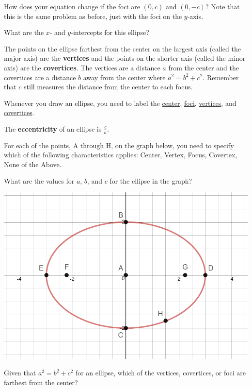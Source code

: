 \begin{annotation}
\end{annotation}

\bq \be
\item How does your equation change if the foci are $(0,c)$ and $(0,-c)$? Note that this is the same problem as before, just with the foci on the $y$-axis.
\item What are the $x$- and $y$-intercepts for this ellipse?
\ee \eq

\begin{info}
The points on the ellipse farthest from the center on the largest axis (called the major axis) are the \textbf{vertices} and the points on the shorter axis (called the minor axis) are the \textbf{covertices}. The vertices are a distance $a$ from the center and the covertices are a distance $b$ away from the center where $a^2=b^2+c^2$. Remember that $c$ still measures the distance from the center to each focus.

Whenever you draw an ellipse, you need to label the \underline{center}, \underline{foci}, \underline{vertices}, and \underline{covertices}.

The \textbf{eccentricity} of an ellipse is $\frac{c}{a}$. \end{info}
\bq For each of the points, A through H, on the graph below, you need to specify which of the following characteristics applies: Center, Vertex, Focus, Covertex, None of the Above.

What are the values for $a$, $b$, and $c$ for the ellipse in the graph?
\eq
\begin{center} \includegraphics[scale=.5]{ellipse4.png} \end{center}
\bq Given that $a^2=b^2+c^2$ for an ellipse, which of the vertices, covertices, or foci are farthest from the center? \eq

